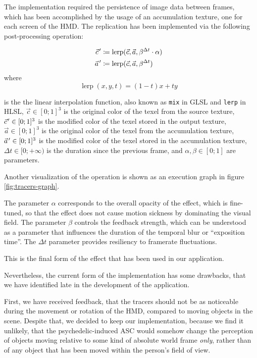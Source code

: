 The implementation required the persistence of image data between frames, which has been accomplished by the usage of an accumulation texture, one for each screen of the \ac{HMD}. The replication has been implemented via the following post-processing operation:

\begin{align}
    \pvec{c}' &\coloneqq \operatorname{lerp}(\vec{c}, \vec{a}, \beta^{\Delta t} \cdot \alpha) \\
    \pvec{a}' &\coloneqq \operatorname{lerp}(\vec{c}, \vec{a}, \beta^{\Delta t})
\end{align}
where
\begin{equation}
    \operatorname{lerp}(x, y, t) = (1 - t)x + ty
\end{equation}

is the the linear interpolation function, also known as \texttt{mix} in \ac{GLSL} and \texttt{lerp} in \ac{HLSL}, $\vec{c} \in [0; 1]^3$ is the original color of the texel from the source texture, $\pvec{c}' \in [0; 1]^3$ is the modified color of the texel stored in the output texture, $\vec{a} \in [0; 1]^3$ is the original color of the texel from the accumulation texture, $\pvec{a}' \in [0; 1]^3$ is the modified color of the texel stored in the accumulation texture, $\Delta t \in [0; +\infty)$ is the duration since the previous frame, and $\alpha, \beta \in [0; 1]$ are parameters.

Another visualization of the operation is shown as an execution graph in figure \ref{fig:tracers-graph}.

The parameter $\alpha$ corresponds to the overall opacity of the effect, which is fine-tuned, so that the effect does not cause motion sickness by dominating the visual field. The parameter $\beta$ controls the feedback strength, which can be understood as a parameter that influences the duration of the temporal blur or ``exposition time''. The $\Delta t$ parameter provides resiliency to framerate fluctuations.

This is the final form of the effect that has been used in our application.

Nevertheless, the current form of the implementation has some drawbacks, that we have identified late in the development of the application.

First, we have received feedback, that the tracers should not be as noticeable during the movement or rotation of the \ac{HMD}, compared to moving objects in the scene. Despite that, we decided to keep our implementation, because we find it unlikely, that the psychedelic-induced \ac{ASC} would somehow change the perception of objects moving relative to some kind of absolute world frame \textit{only}, rather than of any object that has been moved within the person's field of view.

